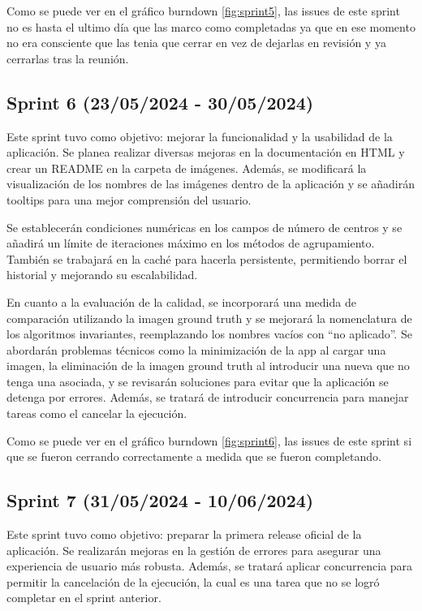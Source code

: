 Como se puede ver en el gráfico burndown \ref{fig:sprint5}, las issues de este sprint no es hasta el ultimo día que las marco como completadas ya que en ese momento no era consciente que las tenia que cerrar en vez de dejarlas en revisión y ya cerrarlas tras la reunión. 


\subsection{Sprint 6 (23/05/2024 - 30/05/2024)}\label{sprint-6}

Este sprint tuvo como objetivo: mejorar la funcionalidad y la usabilidad de la aplicación. Se planea realizar diversas mejoras en la documentación en HTML y crear un README en la carpeta de imágenes. Además, se modificará la visualización de los nombres de las imágenes dentro de la aplicación y se añadirán tooltips para una mejor comprensión del usuario.

Se establecerán condiciones numéricas en los campos de número de centros y se añadirá un límite de iteraciones máximo en los métodos de agrupamiento. También se trabajará en la caché para hacerla persistente, permitiendo borrar el historial y mejorando su escalabilidad.

En cuanto a la evaluación de la calidad, se incorporará una medida de comparación utilizando la imagen ground truth y se mejorará la nomenclatura de los algoritmos invariantes, reemplazando los nombres vacíos con “no aplicado”. Se abordarán problemas técnicos como la minimización de la app al cargar una imagen, la eliminación de la imagen ground truth al introducir una nueva que no tenga una asociada, y se revisarán soluciones para evitar que la aplicación se detenga por errores. Además, se tratará de introducir concurrencia para manejar tareas como el cancelar la ejecución.


Como se puede ver en el gráfico burndown \ref{fig:sprint6}, las issues de este sprint si que se fueron cerrando correctamente a medida que se fueron completando.


\subsection{Sprint 7 (31/05/2024 - 10/06/2024)}\label{sprint-7}

Este sprint tuvo como objetivo: preparar la primera release oficial de la aplicación. Se realizarán mejoras en la gestión de errores para asegurar una experiencia de usuario más robusta. Además, se tratará aplicar concurrencia para permitir la cancelación de la ejecución, la cual es una tarea que no se logró completar en el sprint anterior.

